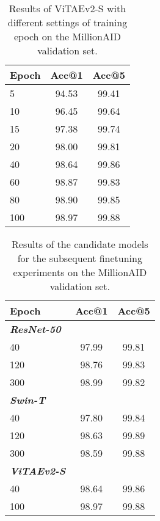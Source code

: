 \documentclass[10pt, journal,twoside]{IEEEtran}
\begin{document}
\begin{table}[t]
  \scriptsize
  \caption{Results of ViTAEv2-S with different settings of training epoch on the MillionAID validation set.}
  \newcommand{\tabincell}[2]{\begin{tabular}{@{}#1@{}}#2\end{tabular}}
  \centering
  \begin{tabular}{l|c|c}
  \hline
  Epoch & Acc@1 & Acc@5\\
  \hline
  5 & 94.53 & 99.41 \\
  10 & 96.45 & 99.64 \\
  15 & 97.38 & 99.74 \\
  20 & 98.00 & 99.81 \\
  40 & 98.64 & 99.86 \\
  60 & 98.87 & 99.83 \\
  80 & 98.90 & 99.85 \\
  100 & 98.97 & 99.88\\
  \hline
\end{tabular}
\label{vitae_rsp}
\end{table}

\begin{table}[t]
  \scriptsize
  \caption{Results of the candidate models for the subsequent finetuning experiments on the MillionAID validation set.}
  \newcommand{\tabincell}[2]{\begin{tabular}{@{}#1@{}}#2\end{tabular}}
  \centering
  \begin{tabular}{l|c|c}
  \hline
  Epoch & Acc@1 & Acc@5 \\
  \hline
  \bfseries \textit{ResNet-50} & \multicolumn{2}{c}{}\\
  \hline
  40 & 97.99 & 99.81  \\
  120 & 98.76 & 99.83 \\
  300 & 98.99 & 99.82 \\
  \hline
  \bfseries \textit{Swin-T} & \multicolumn{2}{c}{}\\
  \hline
  40 & 97.80 & 99.84  \\
  120 & 98.63 & 99.89 \\
  300 & 98.59 & 99.88  \\
  \hline
  \bfseries \textit{ViTAEv2-S} & \multicolumn{2}{c}{}\\
  \hline
  40 & 98.64 & 99.86 \\
  100 & 98.97 & 99.88 \\
  \hline
\end{tabular}
\label{final_models}
\end{table}
\end{document}
